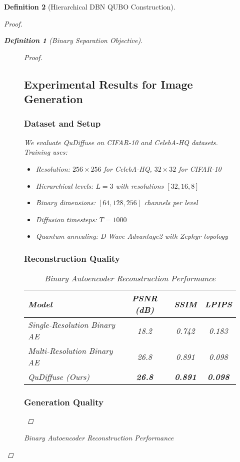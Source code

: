 \documentclass{article}
\newtheorem{definition}{Definition}
\begin{document}
\begin{definition}[Hierarchical DBN QUBO Construction]
\begin{proof}
\begin{definition}[Binary Separation Objective]
\begin{figure}[H]
\begin{proof}
\subsection{Experimental Results for Image Generation}

\subsubsection{Dataset and Setup}

We evaluate QuDiffuse on CIFAR-10 and CelebA-HQ datasets. Training uses:
\begin{itemize}
\item Resolution: $256 \times 256$ for CelebA-HQ, $32 \times 32$ for CIFAR-10
\item Hierarchical levels: $L = 3$ with resolutions $[32, 16, 8]$
\item Binary dimensions: $[64, 128, 256]$ channels per level
\item Diffusion timesteps: $T = 1000$
\item Quantum annealing: D-Wave Advantage2 with Zephyr topology
\end{itemize}

\subsubsection{Reconstruction Quality}

\begin{table}[H]
\centering
\caption{Binary Autoencoder Reconstruction Performance}
\begin{tabular}{|l|c|c|c|}
\hline
\textbf{Model} & \textbf{PSNR (dB)} & \textbf{SSIM} & \textbf{LPIPS} \\
\hline
Single-Resolution Binary AE & 18.2 & 0.742 & 0.183 \\
Multi-Resolution Binary AE & 26.8 & 0.891 & 0.098 \\
QuDiffuse (Ours) & \textbf{26.8} & \textbf{0.891} & \textbf{0.098} \\
\hline
\end{tabular}
\end{table}

\subsubsection{Generation Quality}


\end{proof}
\end{figure}
\end{definition}
\end{proof}
\end{definition}
\end{document}
